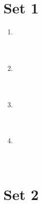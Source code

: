 \documentclass[11pt]{article}
\theoremstyle{definition}
\newcommand{\fdbox}[2]{\fbox{\sffamily\LARGE\vphantom y#1: \bfseries #2} \par\vspace{1em}} %
\begin{document}
\newcommand{\logo}{%
\begin{minipage}[b]{22em}
\centering\noindent
\\[0.5em]
\begin{minipage}[t][4em][t]{12em} \centering
{\huge \bfseries ${\bf 27^{\text{th}}}$ TJIMO } \\
\textsc{\large Alexandria, Virginia}
\end{minipage}
\end{minipage}
\vspace*{-0.05em}
}
\newcommand{\sevenpoints}{}
\newcommand{\righthead}{\fdbox{Round}{Practice Guts}\fdbox{Team Number}{\phantom{00}}}

\section*{Set 1}

\begin{multicols*}{1}
 \begin{enumerate} 
\setcounter{enumi}{0}

\item \underline{\phantom{000000000000000}} \\ \\ \\
\item \underline{\phantom{000000000000000}} \\ \\ \\
\item \underline{\phantom{000000000000000}} \\ \\ \\
\item \underline{\phantom{000000000000000}} \\ \\ \\

\end{enumerate} \end{multicols*}

\eject

\section*{Set 2}
\end{document}
